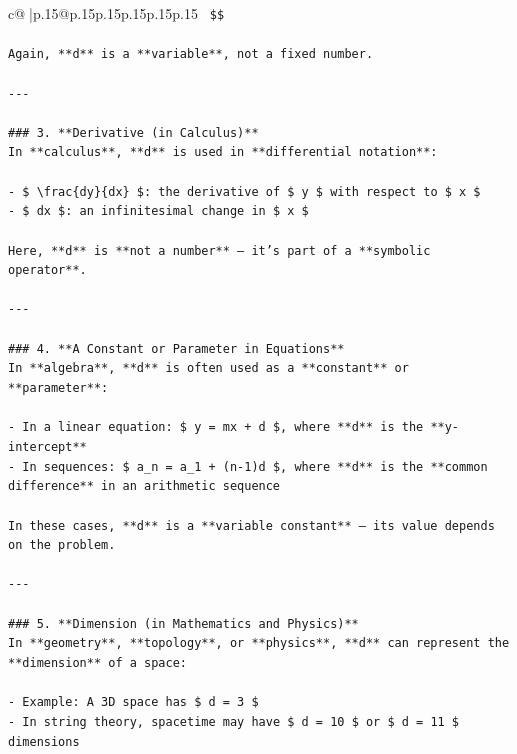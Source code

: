 \documentclass{article}
\begin{document}
{\begin{supertabular}{c@{$\;$}|p{.15\linewidth}@{}p{.15\linewidth}p{.15\linewidth}p{.15\linewidth}p{.15\linewidth}p{.15\linewidth}}
{{{\texttt{  \$\$} \\
\\ 
\texttt{Again, **d** is a **variable**, not a fixed number.} \\
\\ 
\texttt{{-}{-}{-}} \\
\\ 
\texttt{\#\#\# 3. **Derivative (in Calculus)**} \\
\texttt{In **calculus**, **d** is used in **differential notation**:} \\
\\ 
\texttt{{-} \$ \textbackslash{}frac\{dy\}\{dx\} \$: the derivative of \$ y \$ with respect to \$ x \$} \\
\texttt{{-} \$ dx \$: an infinitesimal change in \$ x \$} \\
\\ 
\texttt{Here, **d** is **not a number** — it's part of a **symbolic operator**.} \\
\\ 
\texttt{{-}{-}{-}} \\
\\ 
\texttt{\#\#\# 4. **A Constant or Parameter in Equations**} \\
\texttt{In **algebra**, **d** is often used as a **constant** or **parameter**:} \\
\\ 
\texttt{{-} In a linear equation: \$ y = mx + d \$, where **d** is the **y{-}intercept**} \\
\texttt{{-} In sequences: \$ a\_n = a\_1 + (n{-}1)d \$, where **d** is the **common difference** in an arithmetic sequence} \\
\\ 
\texttt{In these cases, **d** is a **variable constant** — its value depends on the problem.} \\
\\ 
\texttt{{-}{-}{-}} \\
\\ 
\texttt{\#\#\# 5. **Dimension (in Mathematics and Physics)**} \\
\texttt{In **geometry**, **topology**, or **physics**, **d** can represent the **dimension** of a space:} \\
\\ 
\texttt{{-} Example: A 3D space has \$ d = 3 \$} \\
\texttt{{-} In string theory, spacetime may have \$ d = 10 \$ or \$ d = 11 \$ dimensions} \\
\\ 
}}}
\end{supertabular}}
\end{document}
